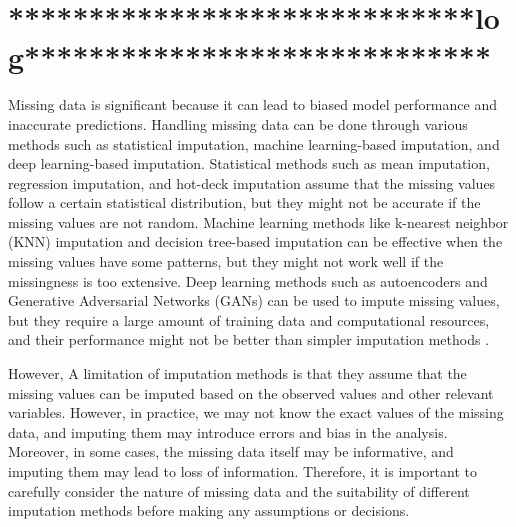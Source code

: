 
\section*{*****************************log*****************************}





Missing data is significant because it can lead to biased model performance and inaccurate predictions. Handling missing data can be done through various methods such as statistical imputation, machine learning-based imputation, and deep learning-based imputation. Statistical methods such as mean imputation, regression imputation, and hot-deck imputation assume that the missing values follow a certain statistical distribution, but they might not be accurate if the missing values are not random. Machine learning methods like k-nearest neighbor (KNN) imputation \cite{missingDNA} and decision tree-based imputation \cite{missingTree} can be effective when the missing values have some patterns, but they might not work well if the missingness is too extensive. Deep learning methods such as autoencoders \cite{missingAutoen} and Generative Adversarial Networks (GANs) \cite{GAIN} can be used to impute missing values, but they require a large amount of training data and computational resources, and their performance might not be better than simpler imputation methods \cite{Garcia}.

However, A limitation of imputation methods is that they assume that the missing values can be imputed based on the observed values and other relevant variables. However, in practice, we may not know the exact values of the missing data, and imputing them may introduce errors and bias in the analysis. Moreover, in some cases, the missing data itself may be informative, and imputing them may lead to loss of information. Therefore, it is important to carefully consider the nature of missing data and the suitability of different imputation methods before making any assumptions or decisions.

